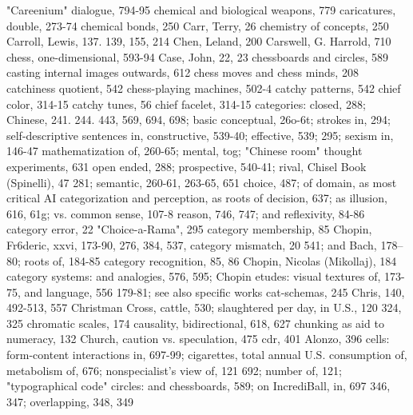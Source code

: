 "Careenium" dialogue, 794-95                     chemical and biological weapons, 779
caricatures, double, 273-74                      chemical bonds, 250
Carr, Terry, 26                                  chemistry of concepts, 250
Carroll, Lewis, 137. 139, 155, 214               Chen, Leland, 200
Carswell, G. Harrold, 710                        chess, one-dimensional, 593-94
Case, John, 22, 23                               chessboards and circles, 589
casting internal images outwards, 612            chess moves and chess minds, 208
catchiness quotient, 542                         chess-playing machines, 502-4
catchy patterns, 542                             chief color, 314-15
catchy tunes, 56                                 chief facelet, 314-15
categories: closed, 288;                         Chinese, 241. 244. 443, 569, 694, 698; basic
conceptual, 26o-6t;                               strokes in, 294; self-descriptive sentences in,
constructive, 539-40; effective, 539;             295; sexism in, 146-47
 mathematization of, 260-65; mental, tog;        "Chinese room" thought experiments, 631
 open ended, 288; prospective, 540-41; rival,    Chisel Book (Spinelli), 47
 281; semantic, 260-61, 263-65, 651              choice, 487; of domain, as most critical AI
categorization and perception, as roots of        decision, 637; as illusion, 616, 61g; vs.
 common sense, 107-8                              reason, 746, 747; and reflexivity, 84-86
category error, 22                               "Choice-a-Rama", 295
category membership, 85                          Chopin, Fr6deric, xxvi, 173-90, 276, 384, 537,
category mismatch, 20                             541; and Bach, 178--80; roots of, 184-85
category recognition, 85, 86                     Chopin, Nicolas (Mikollaj), 184
category systems: and analogies, 576, 595;       Chopin etudes: visual textures of, 173-75,
 and language, 556                                179-81; see also specific works
cat-schemas, 245                                 Chris, 140, 492-513, 557 Christman Cross,
cattle, 530; slaughtered per day, in U.S., 120    324, 325 chromatic scales, 174
causality, bidirectional, 618, 627               chunking as aid to numeracy, 132 Church,
caution vs. speculation, 475 cdr, 401             Alonzo, 396
cells: form-content interactions in, 697-99;     cigarettes, total annual U.S. consumption of,
 metabolism of, 676; nonspecialist's view of,    121
 692; number of, 121; "typographical code"       circles: and chessboards, 589; on IncrediBall,
 in, 697                                          346, 347; overlapping, 348, 349
